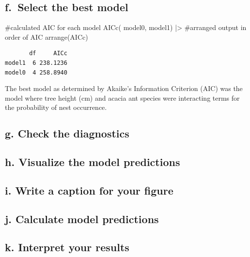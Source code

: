 \documentclass[
  letterpaper,
  DIV=11,
  numbers=noendperiod]{scrartcl}
\newenvironment{Shaded}{\begin{snugshade}}{\end{snugshade}}
\newcommand{\CommentTok}[1]{\textcolor[rgb]{0.37,0.37,0.37}{#1}}
\newcommand{\FunctionTok}[1]{\textcolor[rgb]{0.28,0.35,0.67}{#1}}
\newcommand{\NormalTok}[1]{\textcolor[rgb]{0.00,0.23,0.31}{#1}}
\newcommand{\SpecialCharTok}[1]{\textcolor[rgb]{0.37,0.37,0.37}{#1}}
\begin{document}
\subsection{f.~Select the best model}\label{f.-select-the-best-model}

\begin{Shaded}
\begin{Highlighting}[]
\CommentTok{\#calculated AIC for each model}
\FunctionTok{AICc}\NormalTok{(}
\NormalTok{  model0,}
\NormalTok{  model1) }\SpecialCharTok{|\textgreater{}} 
\CommentTok{\#arranged output in order of AIC}
  \FunctionTok{arrange}\NormalTok{(AICc)}
\end{Highlighting}
\end{Shaded}

\begin{verbatim}
       df     AICc
model1  6 238.1236
model0  4 258.8940
\end{verbatim}

The best model as determined by Akaike's Information Criterion (AIC) was
the model where tree height (cm) and acacia ant species were interacting
terms for the probability of nest occurrence.

\subsection{g. Check the diagnostics}\label{g.-check-the-diagnostics}

\subsection{h. Visualize the model
predictions}\label{h.-visualize-the-model-predictions}

\subsection{i. Write a caption for your
figure}\label{i.-write-a-caption-for-your-figure}

\subsection{j. Calculate model
predictions}\label{j.-calculate-model-predictions}

\subsection{k. Interpret your results}\label{k.-interpret-your-results}
\end{document}
